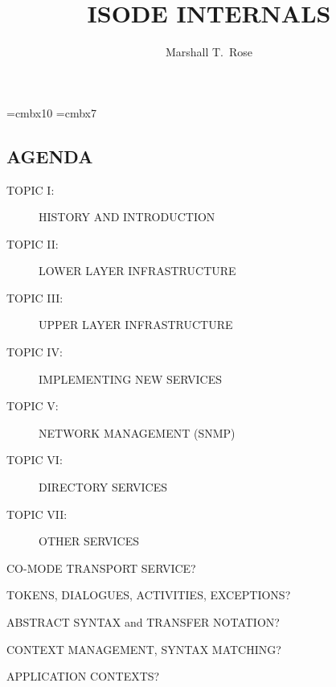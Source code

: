 

\def\emph#1{\underline{#1}}

\font\xx=cmbx10
\font\yy=cmbx7

\raggedright


\let\tradeNAMfont=\relax
\let\tradeORGfont=\relax





\title	{ISODE INTERNALS}
\author	{Marshall T.~Rose}
\date	{}
\maketitlepage


\begin{bwslide}\thispagestyle{empty}
\part*	{AGENDA}\bf

\begin{description}
\item[TOPIC I:]		HISTORY AND INTRODUCTION

\item[TOPIC II:]	LOWER LAYER INFRASTRUCTURE

\item[TOPIC III:]	UPPER LAYER INFRASTRUCTURE

\item[TOPIC IV:]	IMPLEMENTING NEW SERVICES

\item[TOPIC V:]		NETWORK MANAGEMENT (SNMP)

\item[TOPIC VI:]	DIRECTORY SERVICES

\item[TOPIC VII:]	OTHER SERVICES
\end{description}
\end{bwslide}


\setcounter{slide}{0}
\begin{bwslide}

\begin{nrtc}
\item	CO-MODE TRANSPORT SERVICE?

\item	TOKENS, DIALOGUES, ACTIVITIES, EXCEPTIONS?

\item	ABSTRACT SYNTAX and TRANSFER NOTATION?

\item	CONTEXT MANAGEMENT, SYNTAX MATCHING?

\item	APPLICATION CONTEXTS?
\end{nrtc}
\end{bwslide}


